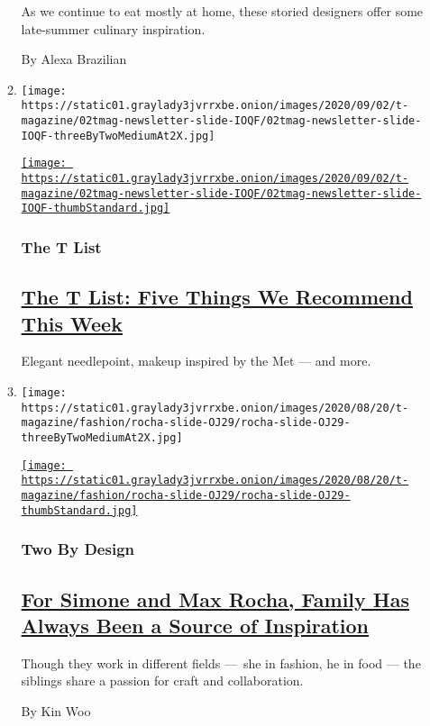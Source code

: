 \begin{enumerate}
\begin{enumerate}
    As we continue to eat mostly at home, these storied designers offer
    some late-summer culinary inspiration.

    By Alexa Brazilian
  \item
    \texttt{[image: https://static01.graylady3jvrrxbe.onion/images/2020/09/02/t-magazine/02tmag-newsletter-slide-IOQF/02tmag-newsletter-slide-IOQF-threeByTwoMediumAt2X.jpg]}

    \href{/2020/09/03/t-magazine/ollies-pizza-estee-lauder-met.html}{\texttt{[image: https://static01.graylady3jvrrxbe.onion/images/2020/09/02/t-magazine/02tmag-newsletter-slide-IOQF/02tmag-newsletter-slide-IOQF-thumbStandard.jpg]}}

    \hypertarget{the-t-list}{%
    \subsubsection{The T List}\label{the-t-list}}

    \hypertarget{the-t-list-five-things-we-recommend-this-week}{%
    \subsection{\texorpdfstring{\href{/2020/09/03/t-magazine/ollies-pizza-estee-lauder-met.html}{The
    T List: Five Things We Recommend This
    Week}}{The T List: Five Things We Recommend This Week}}\label{the-t-list-five-things-we-recommend-this-week}}

    Elegant needlepoint, makeup inspired by the Met --- and more.
  \item
    \texttt{[image: https://static01.graylady3jvrrxbe.onion/images/2020/08/20/t-magazine/fashion/rocha-slide-OJ29/rocha-slide-OJ29-threeByTwoMediumAt2X.jpg]}

    \href{/2020/09/01/t-magazine/simone-max-rocha-family.html}{\texttt{[image: https://static01.graylady3jvrrxbe.onion/images/2020/08/20/t-magazine/fashion/rocha-slide-OJ29/rocha-slide-OJ29-thumbStandard.jpg]}}

    \hypertarget{two-by-design}{%
    \subsubsection{Two By Design}\label{two-by-design}}

    \hypertarget{for-simone-and-max-rocha-family-has-always-been-a-source-of-inspiration}{%
    \subsection{\texorpdfstring{\href{/2020/09/01/t-magazine/simone-max-rocha-family.html}{For
    Simone and Max Rocha, Family Has Always Been a Source of
    Inspiration}}{For Simone and Max Rocha, Family Has Always Been a Source of Inspiration}}\label{for-simone-and-max-rocha-family-has-always-been-a-source-of-inspiration}}

    Though they work in different fields ---~she in fashion, he in food
    --- the siblings share a passion for craft and collaboration.

    By Kin Woo
  \end{enumerate}
\end{enumerate}

